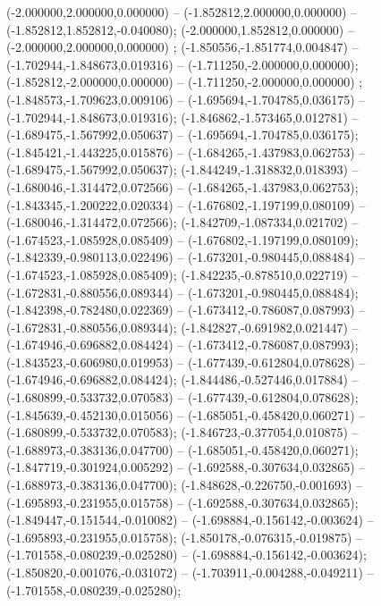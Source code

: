  (-2.000000,2.000000,0.000000) -- (-1.852812,2.000000,0.000000) -- (-1.852812,1.852812,-0.040080);
 (-2.000000,1.852812,0.000000) -- (-2.000000,2.000000,0.000000) ;
 (-1.850556,-1.851774,0.004847) -- (-1.702944,-1.848673,0.019316) -- (-1.711250,-2.000000,0.000000);
 (-1.852812,-2.000000,0.000000) -- (-1.711250,-2.000000,0.000000) ;
 (-1.848573,-1.709623,0.009106) -- (-1.695694,-1.704785,0.036175) -- (-1.702944,-1.848673,0.019316);
 (-1.846862,-1.573465,0.012781) -- (-1.689475,-1.567992,0.050637) -- (-1.695694,-1.704785,0.036175);
 (-1.845421,-1.443225,0.015876) -- (-1.684265,-1.437983,0.062753) -- (-1.689475,-1.567992,0.050637);
 (-1.844249,-1.318832,0.018393) -- (-1.680046,-1.314472,0.072566) -- (-1.684265,-1.437983,0.062753);
 (-1.843345,-1.200222,0.020334) -- (-1.676802,-1.197199,0.080109) -- (-1.680046,-1.314472,0.072566);
 (-1.842709,-1.087334,0.021702) -- (-1.674523,-1.085928,0.085409) -- (-1.676802,-1.197199,0.080109);
 (-1.842339,-0.980113,0.022496) -- (-1.673201,-0.980445,0.088484) -- (-1.674523,-1.085928,0.085409);
 (-1.842235,-0.878510,0.022719) -- (-1.672831,-0.880556,0.089344) -- (-1.673201,-0.980445,0.088484);
 (-1.842398,-0.782480,0.022369) -- (-1.673412,-0.786087,0.087993) -- (-1.672831,-0.880556,0.089344);
 (-1.842827,-0.691982,0.021447) -- (-1.674946,-0.696882,0.084424) -- (-1.673412,-0.786087,0.087993);
 (-1.843523,-0.606980,0.019953) -- (-1.677439,-0.612804,0.078628) -- (-1.674946,-0.696882,0.084424);
 (-1.844486,-0.527446,0.017884) -- (-1.680899,-0.533732,0.070583) -- (-1.677439,-0.612804,0.078628);
 (-1.845639,-0.452130,0.015056) -- (-1.685051,-0.458420,0.060271) -- (-1.680899,-0.533732,0.070583);
 (-1.846723,-0.377054,0.010875) -- (-1.688973,-0.383136,0.047700) -- (-1.685051,-0.458420,0.060271);
 (-1.847719,-0.301924,0.005292) -- (-1.692588,-0.307634,0.032865) -- (-1.688973,-0.383136,0.047700);
 (-1.848628,-0.226750,-0.001693) -- (-1.695893,-0.231955,0.015758) -- (-1.692588,-0.307634,0.032865);
 (-1.849447,-0.151544,-0.010082) -- (-1.698884,-0.156142,-0.003624) -- (-1.695893,-0.231955,0.015758);
 (-1.850178,-0.076315,-0.019875) -- (-1.701558,-0.080239,-0.025280) -- (-1.698884,-0.156142,-0.003624);
 (-1.850820,-0.001076,-0.031072) -- (-1.703911,-0.004288,-0.049211) -- (-1.701558,-0.080239,-0.025280);
